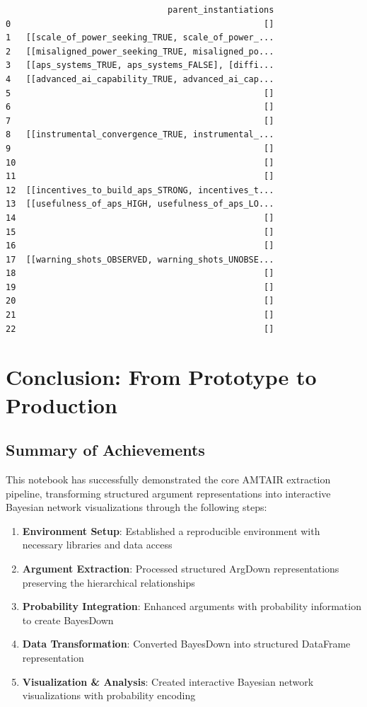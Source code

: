 \documentclass[
  11pt,
  letterpaper,
]{book}
\providecommand{\tightlist}{%
  \setlength{\itemsep}{0pt}\setlength{\parskip}{0pt}}
\begin{document}
\begin{verbatim}
                                parent_instantiations  
0                                                  []  
1   [[scale_of_power_seeking_TRUE, scale_of_power_...  
2   [[misaligned_power_seeking_TRUE, misaligned_po...  
3   [[aps_systems_TRUE, aps_systems_FALSE], [diffi...  
4   [[advanced_ai_capability_TRUE, advanced_ai_cap...  
5                                                  []  
6                                                  []  
7                                                  []  
8   [[instrumental_convergence_TRUE, instrumental_...  
9                                                  []  
10                                                 []  
11                                                 []  
12  [[incentives_to_build_aps_STRONG, incentives_t...  
13  [[usefulness_of_aps_HIGH, usefulness_of_aps_LO...  
14                                                 []  
15                                                 []  
16                                                 []  
17  [[warning_shots_OBSERVED, warning_shots_UNOBSE...  
18                                                 []  
19                                                 []  
20                                                 []  
21                                                 []  
22                                                 []  
\end{verbatim}

\chapter{Conclusion: From Prototype to
Production}\label{conclusion-from-prototype-to-production}

\section{Summary of Achievements}\label{summary-of-achievements}

This notebook has successfully demonstrated the core AMTAIR extraction
pipeline, transforming structured argument representations into
interactive Bayesian network visualizations through the following steps:

\begin{enumerate}
\def\labelenumi{\arabic{enumi}.}
\tightlist
\item
  \textbf{Environment Setup}: Established a reproducible environment
  with necessary libraries and data access
\item
  \textbf{Argument Extraction}: Processed structured ArgDown
  representations preserving the hierarchical relationships
\item
  \textbf{Probability Integration}: Enhanced arguments with probability
  information to create BayesDown
\item
  \textbf{Data Transformation}: Converted BayesDown into structured
  DataFrame representation
\item
  \textbf{Visualization \& Analysis}: Created interactive Bayesian
  network visualizations with probability encoding
\end{enumerate}
\end{document}
